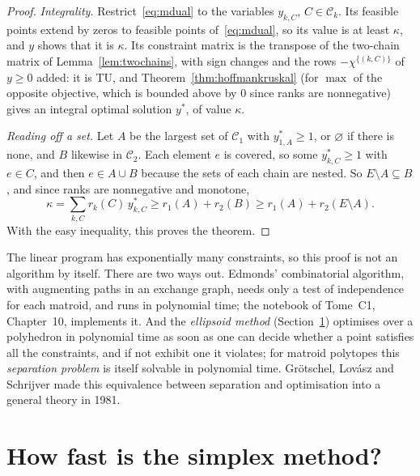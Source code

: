 \begin{proof}
\emph{Integrality.} Restrict~\eqref{eq:mdual} to the variables $y_{k,C}$, $C\in\mathcal C_k$. Its feasible points extend by zeros to feasible points of~\eqref{eq:mdual}, so its value is at least $\kappa$, and $y$ shows that it is $\kappa$. Its constraint
matrix is the transpose of the two-chain matrix of Lemma~\ref{lem:twochains}, with sign changes and the rows $-\chi^{\{(k,C)\}}$ of $y\ge0$ added: it is TU, and Theorem~\ref{thm:hoffmankruskal} (for $\max$ of the opposite objective, which is bounded above by $0$
since ranks are nonnegative) gives an integral optimal solution $y^*$, of value $\kappa$.

\emph{Reading off a set.} Let $A$ be the largest set of $\mathcal C_1$ with $y^*_{1,A}\ge1$, or $\varnothing$ if there is none, and $B$ likewise in $\mathcal C_2$. Each element $e$ is covered, so some $y^*_{k,C}\ge1$ with $e\in C$, and then
$e\in A\cup B$ because the sets of each chain are nested. So $E\setminus A\subseteq B$, and since ranks are nonnegative and monotone,
\[
\kappa=\sum_{k,C}r_k(C)\,y^*_{k,C}\ge r_1(A)+r_2(B)\ge r_1(A)+r_2(E\setminus A).
\]
With the easy inequality, this proves the theorem.
\end{proof}

\begin{remark}
The linear program has exponentially many constraints, so this proof is not an algorithm by itself. There are two ways out. Edmonds' combinatorial algorithm, with augmenting paths in an exchange graph, needs only a test of independence for each matroid, and
runs in polynomial time; the notebook of Tome~C1, Chapter~10, implements it. And the \emph{ellipsoid method} (Section~\ref{sec:lpspeed}) optimises over a polyhedron in polynomial time as soon as one can decide whether a point satisfies all the constraints, and if not exhibit one it violates;
for matroid polytopes this \emph{separation problem} is itself solvable in polynomial time. Gr\"otschel, Lov\'asz and Schrijver made this equivalence between separation and optimisation into a general theory in 1981.
\end{remark}

\section{How fast is the simplex method?}\label{sec:lpspeed}

